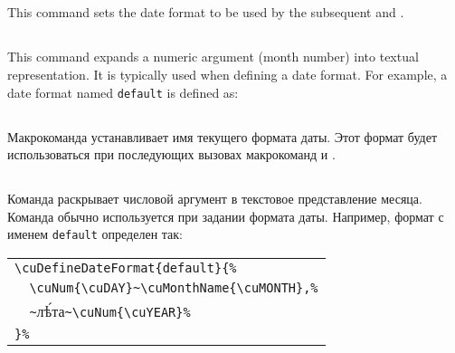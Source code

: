 \begin{EN}
\subsection{}
This command sets the date format to be used by the subsequent  and .

\subsection{}
This command expands a numeric argument (month number) into textual representation. It is typically used when defining a date format.
For example, a date format named \texttt{default} is defined as:
\end{EN}

\begin{RU}
\subsection{}
Макрокоманда устанавливает имя текущего формата даты. Этот формат будет использоваться при последующих вызовах макрокоманд
 и .

\subsection{}
Команда раскрывает числовой аргумент в текстовое представление месяца. Команда обычно используется при задании формата
даты. Например, формат с именем \texttt{default} определен так:
\end{RU}
%
\begin{center}
\begin{churchslavonic}
\begin{tabular}{l}
\verb+\cuDefineDateFormat{default}{%+\\
\verb+  \cuNum{\cuDAY}~\cuMonthName{\cuMONTH},%+\\
\verb+  ~+лѣ́та\verb+~\cuNum{\cuYEAR}%+\\
\verb+}%+\\
\end{tabular}
\end{churchslavonic}
\end{center}

